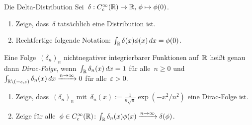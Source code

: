 \documentclass{pizzablatt}
\begin{document}
\begin{aufgabe}{Die Delta-Distribution}
Sei~$\delta : C^\infty_c(\mathbb{R}) \to \mathbb{R},\, \phi \mapsto \phi(0)$.
\begin{enumerate}
\item Zeige, dass~$\delta$ tatsächlich eine Distribution ist.
\item Rechtfertige folgende Notation: $\int_{\mathbb{R}} \delta(x) \phi(x) \,dx =
\phi(0)$.
\end{enumerate}
Eine Folge~$(\delta_n)_n$ nichtnegativer integrierbarer Funktionen
auf~$\mathbb{R}$ heißt genau dann \emph{Dirac-Folge}, wenn~$\int_{\mathbb{R}} \delta_n(x) \,dx
= 1$ für alle~$n \geq 0$ und~$\int_{\mathbb{R} \setminus (-\varepsilon,\varepsilon)}
\delta_n(x) \,dx \xrightarrow{n \to \infty} 0$ für alle~$\varepsilon > 0$.
\begin{enumerate}
\addtocounter{enumi}{2}
\item Zeige, dass~$(\delta_n)_n$ mit~$\delta_n(x) := \frac{1}{n \sqrt{\pi}}
\exp(-x^2 / n^2)$ eine Dirac-Folge ist.
\item Zeige für alle~$\phi \in C^\infty_c(\mathbb{R})$: $\int_{\mathbb{R}} \delta_n(x) \phi(x)
\xrightarrow{n \to \infty} \delta(\phi)$.
\end{enumerate}
\end{aufgabe}
\end{document}
